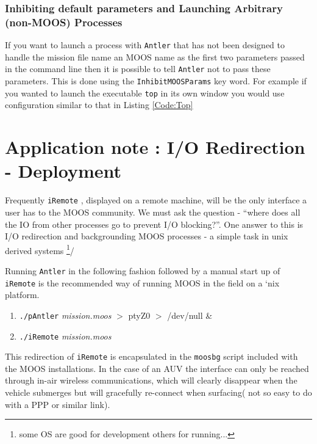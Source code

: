 \documentclass[a4paper,10pt]{article}
\newcommand{\Code}[1]{\texttt{#1} }
\newcommand{\code}[1]{\Code{#1} }
\begin{document}
\subsubsection{Inhibiting default parameters and Launching Arbitrary (non-MOOS) Processes}

If you want to launch a process with \code{Antler} that has not been designed to handle the mission file name an MOOS name as the first two parameters passed in the command line then it is possible to tell \code{Antler} not to pass these parameters. This is done using the \code{InhibitMOOSParams}  key word. For example if you wanted to launch the executable \code{top} in its own window you would use configuration similar to that in Listing \ref{Code:Top}


 



\section{Application note : I/O Redirection - Deployment} 
Frequently \code{iRemote}, displayed on a remote machine, will be
the only interface a user has to the MOOS community.  We
must ask the question -  ``where does all the IO from other
processes go to prevent I/O blocking?''. One answer to this is I/O
redirection and backgrounding MOOS processes - a simple task in
unix derived systems \footnote{some OS are good for development
others for running...}/

Running \code{Antler} in the following fashion followed by a
manual start up of \code{iRemote} is the recommended way of
running MOOS in the field on a `nix platform.

\begin{enumerate}
\item \code{./pAntler} {\it{mission.moos}} $>$ ptyZ0 $>$ /dev/null \&
\item \code{./iRemote} {\it{mission.moos}}
\end{enumerate}

This redirection of \code{iRemote} is encapsulated in the
\code{moosbg} script included with the MOOS installations. In the
case of an AUV the interface can only be reached  through in-air
wireless communications, which will clearly disappear when the
vehicle submerges but will gracefully re-connect when surfacing(
not so easy to do with a PPP or similar link). 
\end{document}
